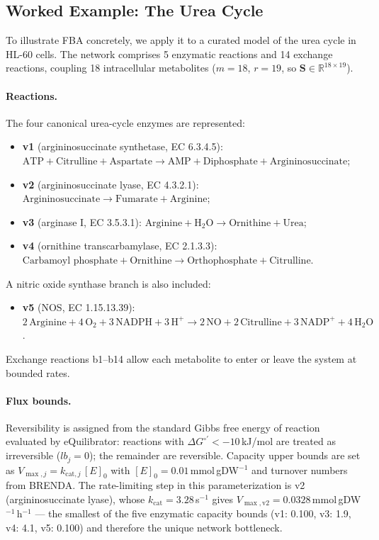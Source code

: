 \subsection{Worked Example: The Urea Cycle}

To illustrate FBA concretely, we apply it to a curated model of the urea cycle
in HL-60 cells.  The network comprises 5 enzymatic reactions and 14 exchange
reactions, coupling 18 intracellular metabolites ($m = 18$, $r = 19$, so
$\mathbf{S} \in \mathbb{R}^{18 \times 19}$).

\paragraph{Reactions.}
The four canonical urea-cycle enzymes are represented:
\begin{itemize}
  \item \textbf{v1} (argininosuccinate synthetase, EC 6.3.4.5):
    $\text{ATP} + \text{Citrulline} + \text{Aspartate} \to
     \text{AMP} + \text{Diphosphate} + \text{Argininosuccinate}$;
  \item \textbf{v2} (argininosuccinate lyase, EC 4.3.2.1):
    $\text{Argininosuccinate} \to \text{Fumarate} + \text{Arginine}$;
  \item \textbf{v3} (arginase I, EC 3.5.3.1):
    $\text{Arginine} + \text{H}_2\text{O} \to \text{Ornithine} + \text{Urea}$;
  \item \textbf{v4} (ornithine transcarbamylase, EC 2.1.3.3):
    $\text{Carbamoyl phosphate} + \text{Ornithine} \to
     \text{Orthophosphate} + \text{Citrulline}$.
\end{itemize}
A nitric oxide synthase branch is also included:
\begin{itemize}
  \item \textbf{v5} (NOS, EC 1.15.13.39):
    $2\,\text{Arginine} + 4\,\text{O}_2 + 3\,\text{NADPH} + 3\,\text{H}^+ \to
     2\,\text{NO} + 2\,\text{Citrulline} + 3\,\text{NADP}^+ + 4\,\text{H}_2\text{O}$.
\end{itemize}
Exchange reactions b1--b14 allow each metabolite to enter or leave the
system at bounded rates.

\paragraph{Flux bounds.}
Reversibility is assigned from the standard Gibbs free energy of reaction
evaluated by eQuilibrator: reactions with $\Delta G^{\circ\prime} < -10$\,kJ/mol
are treated as irreversible ($lb_j = 0$); the remainder are reversible.
Capacity upper bounds are set as $V_{\max,j} = k_{\text{cat},j}\,[E]_0$ with
$[E]_0 = 0.01$\,mmol\,gDW$^{-1}$ and turnover numbers from BRENDA.  The
rate-limiting step in this parameterization is v2 (argininosuccinate lyase),
whose $k_{\text{cat}} = 3.28$\,s$^{-1}$ gives
$V_{\max,\text{v2}} = 0.0328$\,mmol\,gDW$^{-1}$\,h$^{-1}$ --- the smallest
of the five enzymatic capacity bounds (v1: 0.100, v3: 1.9, v4: 4.1, v5: 0.100)
and therefore the unique network bottleneck.

